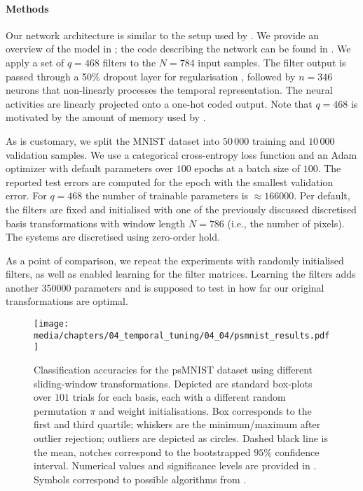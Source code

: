 \paragraph{Methods}
Our network architecture is similar to the setup used by \citet{voelker2019lmu}.
We provide an overview of the model in ; the code describing the network can be found in .
We apply a set of $q = 468$ \FIR filters to the $N = 784$ input samples.
The filter output is passed through a 50\% dropout layer for regularisation \citep{hinton2012improving}, followed by $n = 346$ \ReLU neurons that non-linearly processes the temporal representation.
The neural activities are linearly projected onto a one-hot coded output.
Note that $q = 468$ is motivated by the amount of memory used by \citet{chandar2019nonsaturating}.

As is customary, we split the MNIST dataset into $50\,000$ training and $10\,000$ validation samples.
We use a categorical cross-entropy loss function and an Adam optimizer \citep{kingma2015adam} with default parameters over $100$ epochs at a batch size of $100$.
The reported test errors are computed for the epoch with the smallest validation error.
For $q = 468$ the number of trainable parameters is $\approx\num{166000}$.
Per default, the \FIR filters are fixed and initialised with one of the previously discussed discretised basis transformations with window length $N = 786$ (i.e., the number of pixels).
The \LTI systems are discretised using zero-order hold.

As a point of comparison, we repeat the experiments with randomly initialised \FIR filters, as well as enabled learning for the \FIR filter matrices.
Learning the \FIR filters adds another \num{350000} parameters and is supposed to test in how far our original transformations are optimal.

\begin{figure}
\centering
\texttt{[image: media/chapters/04\_temporal\_tuning/04\_04/psmnist\_results.pdf]}
\caption[Classification accuracies for the psMNIST dataset using different sliding-window transformations]{Classification accuracies for the psMNIST dataset using different sliding-window transformations.
Depicted are standard box-plots over $101$ trials for each basis, each with a different random permutation $\pi$ and weight initialisations. Box corresponds to the first and third quartile; whiskers are the minimum/maximum after outlier rejection; outliers are depicted as circles.
Dashed black line is the mean, notches correspond to the bootstrapped $95\%$ confidence interval.
Numerical values and significance levels are provided in .
Symbols correspond to possible algorithms from .
}
\label{fig:psmnist_results}
\end{figure}


